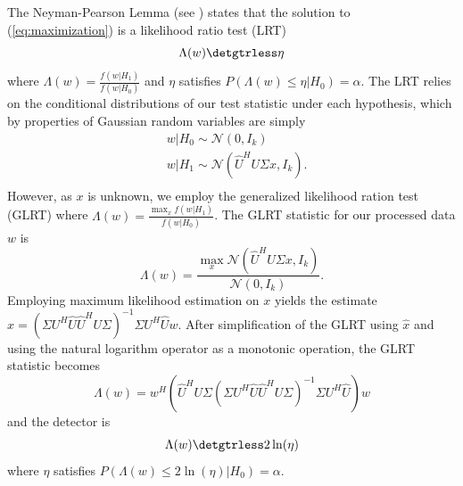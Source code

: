 The Neyman-Pearson Lemma (see \cite{van1968detection}) states that the solution to (\ref{eq:maximization}) is a likelihood ratio test (LRT)
\begin{equation*}
\Lambda(w) \detgtrless \eta
\end{equation*}
where $\Lambda(w) = \frac{f(w|H_1)}{f(w|H_0)}$ and $\eta$ satisfies $P(\Lambda(w)\leq\eta|H_0)=\alpha$. The LRT relies on the conditional distributions of our test statistic under each hypothesis, which by properties of Gaussian random variables are simply
\begin{equation*}
\begin{aligned}
&w|H_0\sim\mathcal{N}(0,I_{k})\\
&w|H_1\sim\mathcal{N}(\widehat{U}^HU\Sigma x, I_{k}).\\
\end{aligned}
\end{equation*}
However, as $x$ is unknown, we employ the generalized likelihood ration test (GLRT) where $\Lambda(w) = \frac{\max_x f(w|H_1)}{f(w|H_0)}$. The GLRT statistic for our processed data $w$ is
\begin{equation*}
\Lambda(w)=\frac{\max_x\mathcal{N}(\widehat{U}^HU\Sigma x,I_{k})}{\mathcal{N}(0,I_{k})}.
\end{equation*}
Employing maximum likelihood estimation on $x$ yields the estimate $\widehat{x}=\left(\Sigma U^H\widehat{U}\widehat{U}^HU\Sigma\right)^{-1}\Sigma U^H\widehat{U}w$. After simplification of the GLRT using $\widehat{x}$ and using the natural logarithm operator as a monotonic operation, the GLRT statistic becomes
\begin{equation}\label{eq:oracle stat}
\Lambda(w) = w^H\left(\widehat{U}^HU\Sigma\left(\Sigma U^H\widehat{U}\widehat{U}^HU\Sigma\right)^{-1}\Sigma U^H\widehat{U}\right)w
\end{equation}
and the detector is
\begin{equation}\label{eq:oracle classifier}
\Lambda(w) \detgtrless 2\ln(\eta)
\end{equation}
where $\eta$ satisfies $P(\Lambda(w)\leq2\ln\left(\eta\right)|H_0)=\alpha$.

